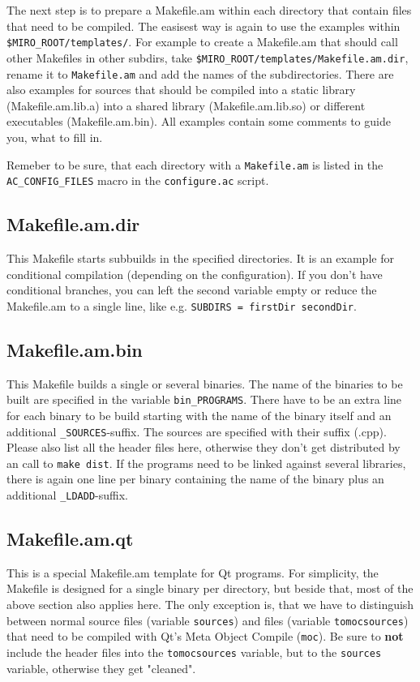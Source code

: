 The next step is to prepare a Makefile.am within each directory that
contain files that need to be compiled. The easisest way is again to
use the examples within {\tt \$MIRO\_ROOT/\-templates/}. For example to
create a Makefile.am that should call other Makefiles in other
subdirs, take {\tt \$MIRO\_ROOT/\-templates/\-Makefile.am.dir}, rename it to
{\tt Makefile.am} and add the names of the subdirectories. There are also
examples for sources that should be compiled into a static library
(Makefile.am.lib.a) into a shared library (Makefile.am.lib.so) or
different executables (Makefile.am.bin). All examples contain some
comments to guide you, what to fill in.

Remeber to be sure, that each directory with a {\tt Makefile.am} is
listed in the {\tt AC\_CONFIG\_FILES} macro in the {\tt configure.ac}
script.


\subsection{Makefile.am.dir}
This Makefile starts subbuilds in the specified directories. It is an
example for conditional compilation (depending on the
configuration). If you don't have conditional branches, you can left
the second variable empty or reduce the Makefile.am to a single line,
like e.g. \texttt{SUBDIRS = firstDir secondDir}.

\subsection{Makefile.am.bin}
This Makefile builds a single or several binaries. The name of the
binaries to be built are specified in the variable {\tt bin\_PROGRAMS}.
There have to be an extra line for each binary to be build starting
with the name of the binary itself and an additional
\texttt{\_SOURCES}-suffix. The sources are specified with their suffix
(.cpp). Please also list all the header files here, otherwise they
don't get distributed by an call to \texttt{make dist}. If the
programs need to be linked against several libraries, there is again
one line per binary containing the name of the binary plus an
additional \texttt{\_LDADD}-suffix.

\subsection{Makefile.am.qt}
This is a special Makefile.am template for Qt programs. For
simplicity, the Makefile is designed for a single binary per
directory, but beside that, most of the above section also applies
here. The only exception is, that we have to distinguish between
normal source files (variable \texttt{sources}) and files (variable
\texttt{tomocsources}) that need to be compiled with Qt's Meta Object
Compile (\texttt{moc}). Be sure to \textbf{not} include the header
files into the \texttt{tomocsources} variable, but to the
\texttt{sources} variable, otherwise they get "cleaned".

